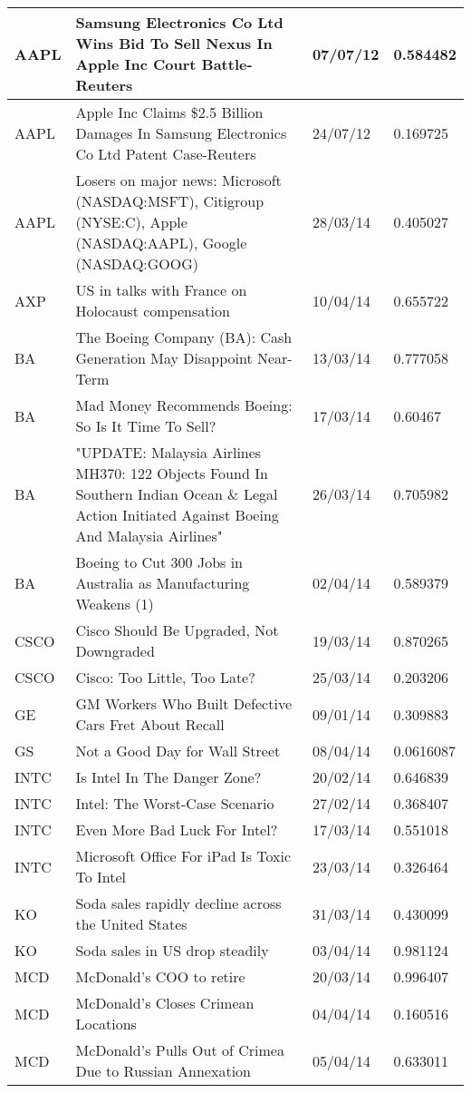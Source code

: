 \begin{table}
\begin{tabular}{ | p{1.1cm\textwidth} | p{8cm\textwidth} | p{1.5cm\textwidth} | p{1.5cm\textwidth} |}
AAPL&Samsung Electronics Co Ltd Wins Bid To Sell Nexus In Apple Inc Court Battle-Reuters&07/07/12&0.584482 \\ \hline
AAPL&Apple Inc Claims \$2.5 Billion Damages In Samsung Electronics Co Ltd Patent Case-Reuters&24/07/12&0.169725 \\ \hline
AAPL&Losers on major news: Microsoft (NASDAQ:MSFT), Citigroup (NYSE:C), Apple (NASDAQ:AAPL), Google (NASDAQ:GOOG)&28/03/14&0.405027 \\ \hline
AXP&US in talks with France on Holocaust compensation&10/04/14&0.655722 \\ \hline
BA&The Boeing Company (BA): Cash Generation May Disappoint Near-Term&13/03/14&0.777058 \\ \hline
BA&Mad Money Recommends Boeing: So Is It Time To Sell?&17/03/14&0.60467 \\ \hline
BA&"UPDATE: Malaysia Airlines MH370: 122 Objects Found In Southern Indian Ocean \& Legal Action Initiated Against Boeing And Malaysia Airlines"&26/03/14&0.705982 \\ \hline
BA&Boeing to Cut 300 Jobs in Australia as Manufacturing Weakens (1)&02/04/14&0.589379 \\ \hline
CSCO&Cisco Should Be Upgraded, Not Downgraded&19/03/14&0.870265 \\ \hline
CSCO&Cisco: Too Little, Too Late?&25/03/14&0.203206 \\ \hline
GE&GM Workers Who Built Defective Cars Fret About Recall&09/01/14&0.309883 \\ \hline
GS&Not a Good Day for Wall Street&08/04/14&0.0616087 \\ \hline
INTC&Is Intel In The Danger Zone?&20/02/14&0.646839 \\ \hline
INTC&Intel: The Worst-Case Scenario&27/02/14&0.368407 \\ \hline
INTC&Even More Bad Luck For Intel?&17/03/14&0.551018 \\ \hline
INTC&Microsoft Office For iPad Is Toxic To Intel&23/03/14&0.326464 \\ \hline
KO&Soda sales rapidly decline across the United States&31/03/14&0.430099 \\ \hline
KO&Soda sales in US drop steadily&03/04/14&0.981124 \\ \hline
MCD&McDonald's COO to retire&20/03/14&0.996407 \\ \hline
MCD&McDonald's Closes Crimean Locations&04/04/14&0.160516 \\ \hline
MCD&McDonald's Pulls Out of Crimea Due to Russian Annexation&05/04/14&0.633011 \\ \hline
    \end{tabular}
\end{table}

